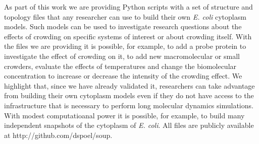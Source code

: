 \documentclass[journal=jcisd8,manuscript=article]{achemso}
\begin{document}
As part of this work we are providing Python scripts with a set of
structure and topology files that any researcher can use to build
their own \textit{E. coli} cytoplasm models. Such models can be used
to investigate research questions about the effects of
crowding on specific systems of interest or about crowding
itself. With the files we are providing it is possible, for example,
to add a probe protein to investigate the effect of crowding on it, to
add new macromolecular or small crowders, evaluate the effects of
 temperatures and change the biomolecular concentration to
increase or decrease the intensity of the crowding effect. We
highlight that, since we have already validated it, researchers can
take advantage from building their own cytoplasm models even if they
do not have access to the infrastructure that is necessary to perform
long molecular dynamics simulations. With modest computatioanal power
it is possible, for example, to build many independent snapshots of
the cytoplasm of \textit{E. coli}. All files are publicly available at
http://github.com/dspoel/soup.

 


 
\end{document}
